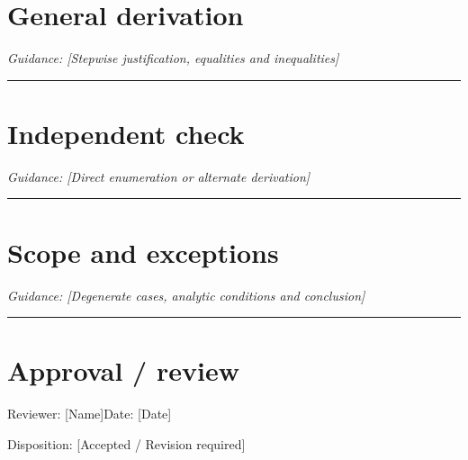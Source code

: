 \documentclass[11pt]{article}
\begin{document}
\section{General derivation}
\noindent\textit{Guidance: [Stepwise justification, equalities and inequalities]}\par\vspace{0.9cm}\hrule\vspace{0.25cm}
\section{Independent check}
\noindent\textit{Guidance: [Direct enumeration or alternate derivation]}\par\vspace{0.9cm}\hrule\vspace{0.25cm}
\section{Scope and exceptions}
\noindent\textit{Guidance: [Degenerate cases, analytic conditions and conclusion]}\par\vspace{0.9cm}\hrule\vspace{0.25cm}
\section{Approval / review}
\noindent Reviewer: [Name]\quad Date: [Date]\par
\noindent Disposition: [Accepted / Revision required]\par\vspace{0.4cm}
\end{document}
